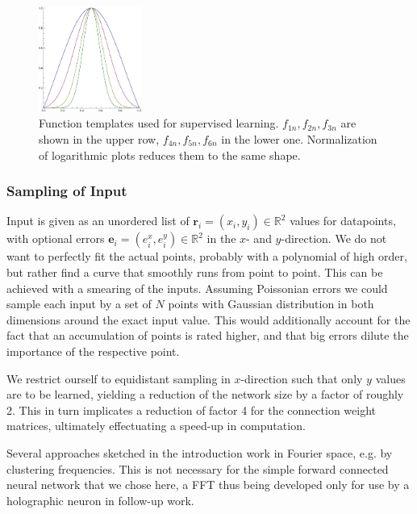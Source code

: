 \documentclass[useAMS,usenatbib]{templates/mn2e}
\begin{document}
\begin{figure}
\begin{center}
    \includegraphics[width=0.3\textwidth]{fig/Template6n.eps}
  \end{center}
  \caption{\label{fig:classfct}Function templates used for supervised
    learning. $f_{1n},f_{2n},f_{3n}$ are shown in the upper row,
    $f_{4n},f_{5n},f_{6n}$ in the lower one. Normalization of
    logarithmic plots reduces them to the same shape.}
\end{figure}

\subsubsection{Sampling of Input}
Input is given as an unordered list of
$\mathbf{r}_i=(x_i,y_i)\in\mathbb{R}^2$ values for datapoints, with
optional errors $\mathbf{e}_i=(e_i^x,e_i^y)\in\mathbb{R}^2$ in the
$x$- and $y$-direction. We do not want to perfectly fit the actual
points, probably with a polynomial of high order, but rather find a
curve that smoothly runs from point to point. This can be achieved
with a smearing of the inputs. Assuming Poissonian errors we could
sample each input by a set of $N$ points with Gaussian distribution in
both dimensions around the exact input value. This would additionally
account for the fact that an accumulation of points is rated higher,
and that big errors dilute the importance of the respective point.

We restrict ourself to equidistant sampling in $x$-direction such
that only $y$ values are to be learned, yielding a reduction of the
network size by a factor of roughly 2. This in turn implicates a reduction of
factor 4 for the connection weight matrices, ultimately effectuating a
speed-up in computation.

Several approaches sketched in the introduction work in Fourier space,
e.g. by clustering frequencies. This is not necessary for the simple
forward connected neural network that we chose here, a FFT thus being
developed only for use by a holographic neuron in follow-up work.

%
\end{document}
